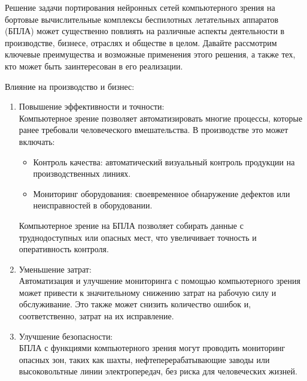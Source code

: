     Решение задачи портирования нейронных сетей компьютерного зрения на бортовые вычислительные комплексы беспилотных летательных аппаратов (БПЛА) может существенно повлиять на различные аспекты деятельности в производстве, бизнесе, отраслях и обществе в целом. Давайте рассмотрим ключевые преимущества и возможные применения этого решения, а также тех, кто может быть заинтересован в его реализации.
    
    Влияние на производство и бизнес:
    \begin{enumerate}
        \item Повышение эффективности и точности: \\
        Компьютерное зрение позволяет автоматизировать многие процессы, которые ранее требовали человеческого вмешательства. В производстве это может включать:
        \begin{itemize}
            \item Контроль качества: автоматический визуальный контроль продукции на производственных линиях.
            \item Мониторинг оборудования: своевременное обнаружение дефектов или неисправностей в оборудовании.
        \end{itemize}
        Компьютерное зрение на БПЛА позволяет собирать данные с труднодоступных или опасных мест, что увеличивает точность и оперативность контроля.
        \item Уменьшение затрат: \\
        Автоматизация и улучшение мониторинга с помощью компьютерного зрения может привести к значительному снижению затрат на рабочую силу и обслуживание. Это также может снизить количество ошибок и, соответственно, затрат на их исправление.
        \item Улучшение безопасности: \\
        БПЛА с функциями компьютерного зрения могут проводить мониторинг опасных зон, таких как шахты, нефтеперерабатывающие заводы или высоковольтные линии электропередач, без риска для человеческих жизней.
    \end{enumerate}

